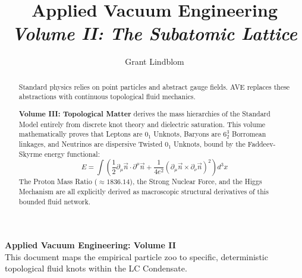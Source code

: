 \title{\textbf{Applied Vacuum Engineering} \\ \large \textit{Volume II: The Subatomic Lattice}}
\author{Grant Lindblom}
\date{}

\maketitle

\vfill
\noindent\textbf{Applied Vacuum Engineering: Volume II} \\
This document maps the empirical particle zoo to specific, deterministic topological fluid knots within the LC Condensate.

\begin{abstract}
    Standard physics relies on point particles and abstract gauge fields. AVE replaces these abstractions with continuous topological fluid mechanics.
    
    \textbf{Volume III: Topological Matter} derives the mass hierarchies of the Standard Model entirely from discrete knot theory and dielectric saturation. This volume mathematically proves that Leptons are $0_1$ Unknots, Baryons are $6^3_2$ Borromean linkages, and Neutrinos are dispersive Twisted $0_1$ Unknots, bound by the Faddeev-Skyrme energy functional:
    \begin{equation}
        E = \int \left( \frac{1}{2}\partial_\mu \vec{n} \cdot \partial^\mu \vec{n} + \frac{1}{4e^2}(\partial_\mu \vec{n} \times \partial_\nu \vec{n})^2 \right) d^3x
    \end{equation}
    The Proton Mass Ratio ($\approx 1836.14$), the Strong Nuclear Force, and the Higgs Mechanism are all explicitly derived as macroscopic structural derivatives of this bounded fluid network.
\end{abstract}
